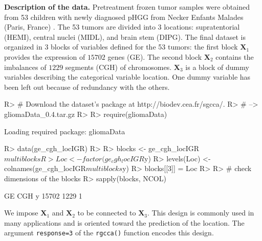 \documentclass[
]{jss}
\begin{document}
\textbf{Description of the data.} Pretreatment frozen tumor samples were
obtained from 53 children with newly diagnosed pHGG from Necker Enfants
Malades (Paris, France) \citep{Puget2012}. The 53 tumors are divided
into 3 locations: supratentorial (HEMI), central nuclei (MIDL), and
brain stem (DIPG). The final dataset is organized in 3 blocks of
variables defined for the 53 tumors: the first block \(\mathbf{X}_1\)
provides the expression of \(15702\) genes (GE). The second block
\(\mathbf{X}_2\) contains the imbalances of \(1229\) segments (CGH) of
chromosomes. \(\mathbf{X}_3\) is a block of dummy variables describing
the categorical variable location. One dummy variable has been left out
because of redundancy with the others.

\footnotesize

\begin{CodeChunk}
\begin{CodeInput}
R> # Download the dataset's package at http://biodev.cea.fr/sgcca/.
R> # --> gliomaData_0.4.tar.gz
R> 
R> require(gliomaData)
\end{CodeInput}
\begin{CodeOutput}
Loading required package: gliomaData
\end{CodeOutput}
\begin{CodeInput}
R> data(ge_cgh_locIGR)
R> 
R> blocks <- ge_cgh_locIGR$multiblocks
R> Loc <- factor(ge_cgh_locIGR$y)
R> levels(Loc) <- colnames(ge_cgh_locIGR$multiblocks$y)
R> blocks[[3]] = Loc
R> 
R> # check dimensions of the blocks
R> sapply(blocks, NCOL)
\end{CodeInput}
\begin{CodeOutput}
   GE   CGH     y 
15702  1229     1 
\end{CodeOutput}
\end{CodeChunk}

\normalsize

We impose \(\mathbf{X}_1\) and \(\mathbf{X}_2\) to be connected to
\(\mathbf{X}_3\). This design is commonly used in many applications and
is oriented toward the prediction of the location. The argument
\texttt{response=3} of the \texttt{rgcca()} function encodes this
design.

\footnotesize
\end{document}

